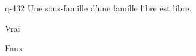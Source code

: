 \begin{truefalse}{q-432}
Une sous-famille d'une famille libre est libre.
\item* Vrai
\item Faux
\end{truefalse}

